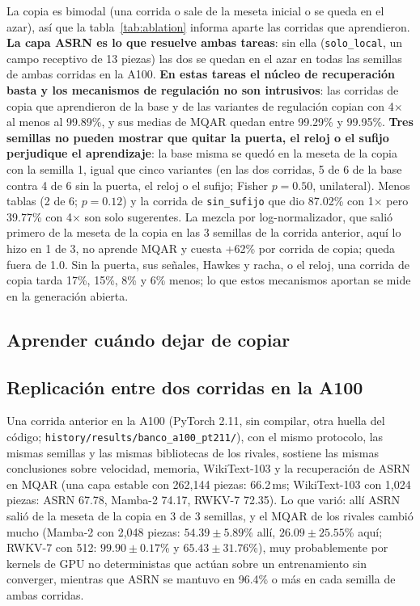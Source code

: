 \documentclass[11pt]{article}
\begin{document}
La copia es bimodal (una corrida o sale de la meseta inicial o se queda en el azar), así que la tabla~\ref{tab:ablation}
informa aparte las corridas que aprendieron. \textbf{La capa ASRN es lo que resuelve ambas tareas}: sin ella
(\texttt{solo\_local}, un campo receptivo de 13 piezas) las dos se quedan en el azar en todas las semillas de ambas
corridas en la A100. \textbf{En estas tareas el núcleo de recuperación basta y los mecanismos de regulación no son
intrusivos}: las corridas de copia que aprendieron de la base y de las variantes de regulación copian con 4$\times$ al
menos al 99.89\%, y sus medias de MQAR quedan entre 99.29\% y 99.95\%. \textbf{Tres semillas no pueden mostrar que
quitar la puerta, el reloj o el sufijo perjudique el aprendizaje}: la base misma se quedó en la meseta de la copia con
la semilla 1, igual que cinco variantes (en las dos corridas, 5 de 6 de la base contra 4 de 6 sin la puerta, el reloj o
el sufijo; Fisher $p=0.50$, unilateral). Menos tablas (2 de 6; $p=0.12$) y la corrida de \texttt{sin\_sufijo} que dio
87.02\% con 1$\times$ pero 39.77\% con 4$\times$ son solo sugerentes. La mezcla por log-normalizador, que salió primero
de la meseta de la copia en las 3 semillas de la corrida anterior, aquí lo hizo en 1 de 3, no aprende MQAR y cuesta
+62\% por corrida de copia; queda fuera de 1.0. Sin la puerta, sus señales, Hawkes y racha, o el reloj, una corrida de
copia tarda 17\%, 15\%, 8\% y 6\% menos; lo que estos mecanismos aportan se mide en la generación abierta.

\subsection{Aprender cuándo dejar de copiar}
\label{sec:quote}



\subsection{Replicación entre dos corridas en la A100}
\label{sec:replication}

Una corrida anterior en la A100 (PyTorch 2.11, sin compilar, otra huella del código;
\nolinkurl{history/results/banco_a100_pt211/}), con el mismo protocolo, las mismas semillas y las mismas bibliotecas de
los rivales, sostiene las mismas conclusiones sobre velocidad, memoria, WikiText-103 y la recuperación de ASRN en MQAR
(una capa estable con 262{,}144 piezas: 66.2\,ms; WikiText-103 con 1{,}024 piezas: ASRN 67.78, Mamba-2 74.17, RWKV-7
72.35). Lo que varió: allí ASRN salió de la meseta de la copia en 3 de 3 semillas, y el MQAR de los rivales cambió mucho
(Mamba-2 con 2{,}048 piezas: $54.39\pm5.89$\% allí, $26.09\pm25.55$\% aquí; RWKV-7 con 512: $99.90\pm0.17$\% y
$65.43\pm31.76$\%), muy probablemente por kernels de GPU no deterministas que actúan sobre un entrenamiento sin
converger, mientras que ASRN se mantuvo en 96.4\% o más en cada semilla de ambas corridas.
\end{document}

